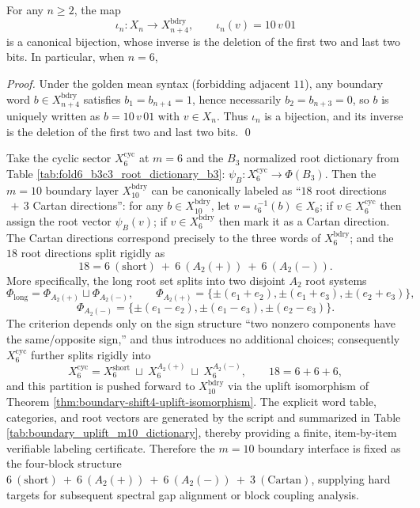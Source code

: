 \begin{theorem}\label{thm:boundary-shift4-uplift-isomorphism}
For any \(n\ge 2\), the map
\[
\iota_n:X_n\to X_{n+4}^{\mathrm{bdry}},\qquad \iota_n(v)=10\,v\,01
\]
is a canonical bijection, whose inverse is the deletion of the first two and last two bits. In particular, when \(n=6\),

\end{theorem}
\begin{proof}
Under the golden mean syntax (forbidding adjacent \(11\)), any boundary word \(b\in X_{n+4}^{\mathrm{bdry}}\) satisfies \(b_1=b_{n+4}=1\), hence necessarily \(b_2=b_{n+3}=0\), so \(b\) is uniquely written as \(b=10\,v\,01\) with \(v\in X_n\).
Thus \(\iota_n\) is a bijection, and its inverse is the deletion of the first two and last two bits. \qed
\end{proof}

\begin{theorem}\label{thm:boundary-m10-b3c3-rigid-four-block-split}
Take the cyclic sector \(X_6^{\mathrm{cyc}}\) at \(m=6\) and the \(B_3\) normalized root dictionary from Table \ref{tab:fold6_b3c3_root_dictionary_b3}:
\(\psi_B:X_6^{\mathrm{cyc}}\to\Phi(B_3)\).
Then the \(m=10\) boundary layer \(X_{10}^{\mathrm{bdry}}\) can be canonically labeled as ``\(18\) root directions \(\,+\,3\) Cartan directions'': for any \(b\in X_{10}^{\mathrm{bdry}}\), let \(v=\iota_6^{-1}(b)\in X_6\); if \(v\in X_6^{\mathrm{cyc}}\) then assign the root vector \(\psi_B(v)\); if \(v\in X_6^{\mathrm{bdry}}\) then mark it as a Cartan direction.
The Cartan directions correspond precisely to the three words of \(X_6^{\mathrm{bdry}}\); and the \(18\) root directions split rigidly as
\[
18=6\ (\mathrm{short})\ +\ 6\ (A_2(+))\ +\ 6\ (A_2(-)).
\]
More specifically, the long root set splits into two disjoint \(A_2\) root systems
\[
\Phi_{\mathrm{long}}=\Phi_{A_2(+)}\sqcup\Phi_{A_2(-)},\qquad
\Phi_{A_2(+)}=\{\pm(e_1+e_2),\pm(e_1+e_3),\pm(e_2+e_3)\},
\]
\[
\Phi_{A_2(-)}=\{\pm(e_1-e_2),\pm(e_1-e_3),\pm(e_2-e_3)\}.
\]
The criterion depends only on the sign structure ``two nonzero components have the same/opposite sign,'' and thus introduces no additional choices; consequently \(X_6^{\mathrm{cyc}}\) further splits rigidly into
\[
X_6^{\mathrm{cyc}}=X_6^{\mathrm{short}}\ \sqcup\ X_6^{A_2(+)}\ \sqcup\ X_6^{A_2(-)},
\qquad 18=6+6+6,
\]
and this partition is pushed forward to \(X_{10}^{\mathrm{bdry}}\) via the uplift isomorphism of Theorem \ref{thm:boundary-shift4-uplift-isomorphism}.
The explicit word table, categories, and root vectors are generated by the script \texttt{} and summarized in Table \ref{tab:boundary_uplift_m10_dictionary}, thereby providing a finite, item-by-item verifiable labeling certificate.
Therefore the \(m=10\) boundary interface is fixed as the four-block structure
\(
6\ (\text{short})\ +\ 6\ (A_2(+))\ +\ 6\ (A_2(-))\ +\ 3\ (\text{Cartan})
\),
supplying hard targets for subsequent spectral gap alignment or block coupling analysis.
\end{theorem}


